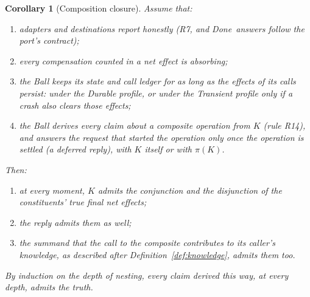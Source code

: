 \documentclass[11pt]{article}
\theoremstyle{definition}
\theoremstyle{plain}
\newtheorem{corollary}{Corollary}
\newcommand{\Done}{\textsf{Done}}
\begin{document}
\begin{corollary}[Composition closure]
\label{cor:closure}
Assume that:
\begin{enumerate}[nosep,label=(\roman*)]
  \item adapters and destinations report honestly (R7, and \Done\ answers follow the port's contract);
  \item every compensation counted in a net effect is absorbing;
  \item the Ball keeps its state and call ledger for as long as the effects of its calls persist: under the Durable profile, or under the Transient profile only if a crash also clears those effects;
  \item the Ball derives every claim about a composite operation from $K$ (rule R14), and answers the request that started the operation only once the operation is settled (a \emph{deferred reply}), with $K$ itself or with $\pi(K)$.
\end{enumerate}
Then:
\begin{enumerate}[nosep,label=(\alph*)]
  \item at every moment, $K$ admits the conjunction and the disjunction of the constituents' true final net effects;
  \item the reply admits them as well;
  \item the summand that the call to the composite contributes to its caller's knowledge, as described after Definition~\ref{def:knowledge}, admits them too.
\end{enumerate}
By induction on the depth of nesting, every claim derived this way, at every depth, admits the truth.
\end{corollary}
\end{document}
